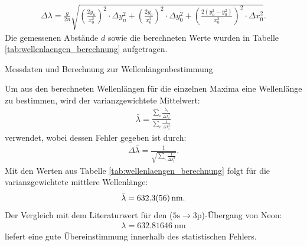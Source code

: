 \documentclass[11pt, a4paper]{article}
\numberwithin{equation}{section}
\begin{document}
\begin{align}
	\Delta \lambda = \frac{g}{2 n} \sqrt{\left( \frac{2 y_n}{x_0^2} \right)^2 \cdot \Delta y_n^2 + \left( \frac{2 y_0}{x_0^2} \right)^2 \cdot \Delta y_0^2 + \left(\frac{2\left(y_n^2 - y_0^2 \right)}{x_0^3}\right)^2 \cdot \Delta x_0^2} \text{.}
\end{align}
Die gemessenen Abstände $d$ sowie die berechneten Werte wurden in Tabelle \ref{tab:wellenlaengen_berechnung} aufgetragen.
\begin{table}[h]
	\centering
	
	\caption{Messdaten und Berechnung zur Wellenlängenbestimmung}
	\label{tab:wellenlaengen_berechnung}
\end{table}
Um aus den berechneten Wellenlängen für die einzelnen Maxima eine Wellenlänge zu bestimmen, wird der varianzgewichtete Mittelwert:
\begin{align}
	\bar{\lambda} = \frac{\sum_i \frac{\lambda_i}{\Delta \lambda_i^2}}{\sum_i \frac{1}{\Delta \lambda_i^2}}
\end{align}
verwendet, wobei dessen Fehler gegeben ist durch:
\begin{align}
\Delta \bar{\lambda} = \frac{1}{\sqrt{\sum_i \frac{1}{\Delta \lambda_i^2}}} \text{.}
\end{align}
Mit den Werten aus Tabelle \ref{tab:wellenlaengen_berechnung} folgt für die varianzgewichtete mittlere Wellenlänge:
\begin{align}
	\bar{\lambda} = \SI{632.3 +- 5.6}{\nano\metre} \text{.}
\end{align}
Der Vergleich mit dem Literaturwert \cite{NISTSpectra} für den ($\mathrm{5s} \rightarrow \mathrm{3p}$)-Übergang von Neon:
\begin{align}
	\lambda = \SI{632.81646}{\nano\metre}
	\label{eq:HeNe_wellenlaenge}
\end{align}
liefert eine gute Übereinstimmung innerhalb des statistischen Fehlers.
\end{document}
